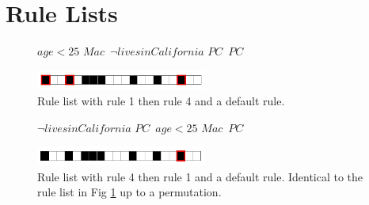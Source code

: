 \section{Rule Lists}

\begin{figure}[t!]
\begin{algorithmic}
\normalsize
\State \bif $age < 25$ \bthen $Mac$\,
\State \belif $\neg lives in California$ \bthen $PC$\,
\State \belse $PC$
\end{algorithmic}

\includegraphics[width=0.5\textwidth]{figs/rule_list_1_cap.png}
\caption{Rule list with rule 1 then rule 4 and a default rule.}
\label{fig:rule-list-1}
\end{figure}

\begin{figure}[t!]
\begin{algorithmic}
\normalsize
\State \bif $\neg lives in California$ \bthen $PC$\,
\State \belif $age < 25$ \bthen $Mac$\,
\State \belse $PC$
\end{algorithmic}

\includegraphics[width=0.5\textwidth]{figs/rule_list_2_cap.png}
\caption{Rule list with rule 4 then rule 1 and a default rule. Identical to the rule list in Fig \ref{fig:rule-list-1} up to a permutation.}
\label{fig:rule-list-2}
\end{figure}

